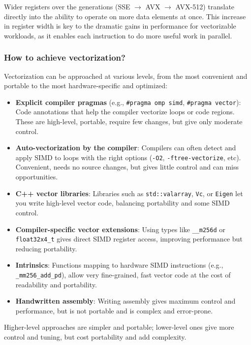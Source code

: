 \vspace{-1em}

Wider registers over the generations (SSE $\rightarrow$ AVX $\rightarrow$ AVX-512) translate directly into the ability to operate on more data elements at once. This increase in register width is key to the dramatic gains in performance for vectorizable workloads, as it enables each instruction to do more useful work in parallel.


\subsubsection{How to achieve vectorization?}

Vectorization can be approached at various levels, from the most convenient and portable to the most hardware-specific and optimized:

\begin{itemize}
    \item \textbf{Explicit compiler pragmas} (e.g., \texttt{\#pragma omp simd}, \texttt{\#pragma vector}): Code annotations that help the compiler vectorize loops or code regions. These are high-level, portable, require few changes, but give only moderate control.
    \item \textbf{Auto-vectorization by the compiler}: Compilers can often detect and apply SIMD to loops with the right options (\texttt{-O2}, \texttt{-ftree-vectorize}, etc). Convenient, needs no source changes, but gives little control and can miss opportunities.
    \item \textbf{C++ vector libraries}: Libraries such as \texttt{std::valarray}, \texttt{Vc}, or \texttt{Eigen} let you write high-level vector code, balancing portability and some SIMD control.
    \item \textbf{Compiler-specific vector extensions}: Using types like \texttt{\_\_m256d} or \texttt{float32x4\_t} gives direct SIMD register access, improving performance but reducing portability.
    \item \textbf{Intrinsics}: Functions mapping to hardware SIMD instructions (e.g., \texttt{\_mm256\_add\_pd}), allow very fine-grained, fast vector code at the cost of readability and portability.
    \item \textbf{Handwritten assembly}: Writing assembly gives maximum control and performance, but is not portable and is complex and error-prone.
\end{itemize}

Higher-level approaches are simpler and portable; lower-level ones give more control and tuning, but cost portability and add complexity.

